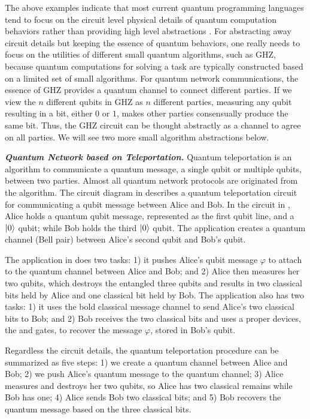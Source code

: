 The above examples indicate that most current quantum programming languages tend to focus on the circuit level physical details of quantum computation behaviors rather than providing high level abstractions \cite{VOQC}.
For abstracting away circuit details but keeping the essence of quantum behaviors,
one really needs to focus on the utilities of different small quantum algorithms, such as GHZ,
because quantum computations for solving a task are typically constructed based on a limited set of small algorithms.
For quantum network communications, the essence of GHZ provides a quantum channel to connect different parties.
If we view the $n$ different qubits in GHZ as $n$ different parties,
measuring any qubit resulting in a bit, either $0$ or $1$, makes other parties consensually produce the same bit.
Thus, the GHZ circuit can be thought abstractly as a channel to agree on all parties.
We will see two more small algorithm abstractions below.

\noindent\textbf{\textit{Quantum Network based on Teleportation.}}
Quantum teleportation \cite{PhysRevLett.70.1895,Rigolin_2005} is an algorithm to communicate a quantum message, a single qubit or multiple qubits, between two parties.
Almost all quantum network protocols are originated from the algorithm.
The circuit diagram in  describes a quantum teleportation circuit for communicating a qubit message between Alice and Bob.
In the circuit in ,
Alice holds a quantum qubit message, represented as the first qubit line, and a $\ket{0}$ qubit;
while Bob holds the third $\ket{0}$ qubit.
The application  creates a quantum channel (Bell pair) between Alice's second qubit and Bob's qubit.

The  application in  does two tasks: 1) it pushes Alice's qubit message $\varphi$ to attach to the quantum channel between Alice and Bob; and 2) Alice then measures her two qubits, which destroys the entangled three qubits and results in two classical bits held by Alice and one classical bit held by Bob.
The  application also has two tasks: 1) it uses the bold classical message channel to send Alice's two classical bits to Bob; and 2) Bob receives the two classical bits and uses a proper devices, the  and  gates, to recover the message $\varphi$, stored in Bob's qubit.

Regardless the circuit details, the quantum teleportation procedure can be summarized as five steps:
1) we create a quantum channel between Alice and Bob;
2) we push Alice's quantum message to the quantum channel;
3) Alice measures and destroys her two qubits, so Alice has two classical remains while Bob has one;
4) Alice sends Bob two classical bits;
and 5) Bob recovers the quantum message based on the three classical bits.

